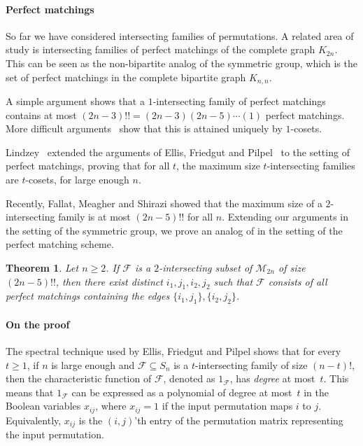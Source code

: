 \documentclass[10pt,a4paper]{amsart}
\newtheorem{theorem}{Theorem}[section]
\theoremstyle{definition}
\providecommand{\cM}{\mathcal{M}}
\begin{document}
\paragraph{Perfect matchings} So far we have considered intersecting families of permutations. A related area of study is intersecting families of perfect matchings of the complete graph $K_{2n}$. This can be seen as the non-bipartite analog of the symmetric group, which is the set of perfect matchings in the complete bipartite graph $K_{n,n}$.

A simple argument shows that a $1$-intersecting family of perfect matchings contains at most $(2n-3)!! = (2n-3)(2n-5)\cdots(1)$ perfect matchings. More difficult arguments~\cite{GodsilMeagherPM,Lindzey17,MeagherMoura,DFLLV} show that this is attained uniquely by $1$-cosets. 

Lindzey~\cite{Lindzey18,LindzeyThesis} extended the arguments of Ellis, Friedgut and Pilpel~\cite{EFP,EllisCameronKu} to the setting of perfect matchings, proving that for all $t$, the maximum size $t$-intersecting families are $t$-cosets, for large enough $n$.

Recently, Fallat, Meagher and Shirazi showed that the maximum size of a $2$-intersecting family is at most $(2n-5)!!$ for all $n$. Extending our arguments in the setting of the symmetric group, we prove an analog of  in the setting of the perfect matching scheme.

\begin{theorem} \label{thm:main-pms}
Let $n \geq 2$. If $\mathcal{F}$ is a $2$-intersecting subset of $\cM_{2n}$ of size $(2n-5)!!$, then there exist distinct $i_1,j_1,i_2,j_2$ such that $\mathcal{F}$ consists of all perfect matchings containing the edges $\{i_1,j_1\},\{i_2,j_2\}$.
\end{theorem}

\paragraph{On the proof} The spectral technique used by Ellis, Friedgut and Pilpel shows that for every $t \geq 1$, if $n$ is large enough and $\mathcal{F} \subseteq S_n$ is a $t$-intersecting family of size $(n-t)!$, then the characteristic function of $\mathcal{F}$, denoted as $1_{\mathcal{F}}$, has \emph{degree} at most~$t$. This means that $1_{\mathcal{F}}$ can be expressed as a polynomial of degree at most~$t$ in the Boolean variables $x_{ij}$, where $x_{ij} = 1$ if the input permutation maps $i$ to $j$. Equivalently, $x_{ij}$ is the $(i,j)$'th entry of the permutation matrix representing the input permutation.
\end{document}
